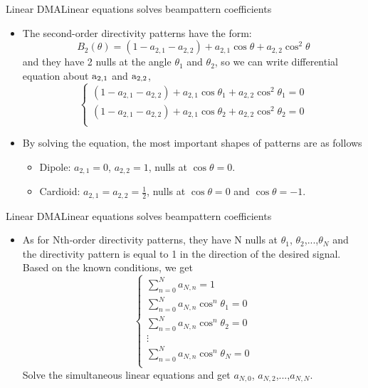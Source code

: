 \documentclass{beamer}
\begin{document}
\begin{frame}{Linear DMA}{Linear equations solves beampattern coefficients}
\begin{itemize}
\item{
The second-order directivity patterns have the form:
\begin{equation}
{{B}_{2}}(\theta )=(1-{{a}_{2,1}}-{{a}_{2,2}})+{{a}_{2,1}}\cos \theta +{{a}_{2,2}}{{\cos }^{2}}\theta 
\end{equation}
and they have 2 nulls at the angle ${{\theta }_{1}}$ and ${{\theta }_{2}}$, so we can write differential equation about ${{\rm{a}}_{2,1}}$ and ${{\rm{a}}_{2,2}}$,
\begin{equation}
\left\{ \begin{array}{*{35}{l}}
   (1-{{a}_{2,1}}-{{a}_{2,2}})+{{a}_{2,1}}\cos {{\theta }_{1}}+{{a}_{2,2}}{{\cos }^{2}}{{\theta }_{1}}=0  \\
   (1-{{a}_{2,1}}-{{a}_{2,2}})+{{a}_{2,1}}\cos {{\theta }_{2}}+{{a}_{2,2}}{{\cos }^{2}}{{\theta }_{2}}=0  \\
\end{array} \right.
\end{equation}
}
\item{
By solving the equation, the most important shapes of patterns are as follows
\begin{itemize}
	\item Dipole: $a_{2,1}  = 0 $, $a_{2,2}  = 1 $, nulls at $ \cos \theta  = 0 $.
	\item Cardioid: $a_{2,1} = a_{2,2} = \frac{1}{2} $, nulls at $ \cos \theta  = 0 $ and $ \cos \theta  = -1 $.

\end{itemize}
}
\end{itemize}
	
\end{frame}

\begin{frame}{Linear DMA}{Linear equations solves beampattern coefficients}
\begin{itemize}
\item{
As for Nth-order directivity patterns, they have N nulls at $ {\theta _1} $, $ {\theta _2} $,...,$ {\theta _N} $ and the directivity pattern is equal to 1 in the direction of the desired signal. Based on the known conditions, we get
\begin{equation}
\left\{ \begin{matrix}
   \sum\limits_{n=0}^{N}{{{a}_{N,n}}=1}  \\
   \sum\limits_{n=0}^{N}{{{a}_{N,n}}{{\cos }^{n}}{{\theta }_{1}}=0}  \\
   \sum\limits_{n=0}^{N}{{{a}_{N,n}}{{\cos }^{n}}{{\theta }_{2}}=0}  \\
   \vdots   \\
   \sum\limits_{n=0}^{N}{{{a}_{N,n}}{{\cos }^{n}}{{\theta }_{N}}=0}  \\
\end{matrix} \right.
\end{equation}
Solve the simultaneous linear equations and get ${a_{N,0}}$, ${a_{N,2}}$,...,${a_{N,N}}$.
}
\end{itemize}
	
\end{frame}
\end{document}
